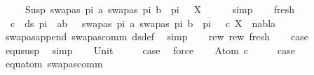\begin{isabellebody}
\ \ \ \ {\isacharequal}{\kern0pt}\ Susp\ {\isacharparenleft}{\kern0pt}{\isacharbrackleft}{\kern0pt}{\isacharparenleft}{\kern0pt}swapas\ pi\ a{\isacharcomma}{\kern0pt}\ swapas\ pi\ b{\isacharparenright}{\kern0pt}{\isacharbrackright}{\kern0pt}\ {\isacharat}{\kern0pt}\ pi\ {\isacharat}{\kern0pt}\ {\isasympi}{\isacharprime}{\kern0pt}{\isacharparenright}{\kern0pt}\ X{\isachardoublequoteclose}\isanewline
\ \ \ \ \isamarkupfalse%
\ simp\isanewline
\ \ \isamarkupfalse%
\ fresh{\isacharcolon}{\kern0pt}\isanewline
\ \ {\isachardoublequoteopen}{\isasymforall}c\ {\isasymin}\ ds\ {\isacharparenleft}{\kern0pt}pi\ {\isacharat}{\kern0pt}\ {\isacharbrackleft}{\kern0pt}{\isacharparenleft}{\kern0pt}a{\isacharcomma}{\kern0pt}b{\isacharparenright}{\kern0pt}{\isacharbrackright}{\kern0pt}\ {\isacharat}{\kern0pt}\ {\isasympi}{\isacharprime}{\kern0pt}{\isacharparenright}{\kern0pt}\ {\isacharparenleft}{\kern0pt}{\isacharbrackleft}{\kern0pt}{\isacharparenleft}{\kern0pt}swapas\ pi\ a{\isacharcomma}{\kern0pt}\ swapas\ pi\ b{\isacharparenright}{\kern0pt}{\isacharbrackright}{\kern0pt}\ {\isacharat}{\kern0pt}\ pi\ {\isacharat}{\kern0pt}\ {\isasympi}{\isacharprime}{\kern0pt}{\isacharparenright}{\kern0pt}{\isachardot}{\kern0pt}\ {\isacharparenleft}{\kern0pt}c{\isacharcomma}{\kern0pt}\ X{\isacharparenright}{\kern0pt}\ {\isasymin}\ nabla{\isachardoublequoteclose}\isanewline
\ \ \ \ \isamarkupfalse%
\ swapas{\isacharunderscore}{\kern0pt}append\ swapas{\isacharunderscore}{\kern0pt}comm\ ds{\isacharunderscore}{\kern0pt}def\ \isamarkupfalse%
\ simp\isanewline
\ \ \isamarkupfalse%
\ rew{}\ rew{}\ fresh\isanewline
\ \ \isamarkupfalse%
\ {\isacharquery}{\kern0pt}case\isanewline
\ \ \ \ \isamarkupfalse%
\ equ{\isacharunderscore}{\kern0pt}susp\ \isamarkupfalse%
\ simp\isanewline
{}\isamarkupfalse%
\isanewline
\ \ \isamarkupfalse%
\ Unit\isanewline
\ \ \isamarkupfalse%
\ \isamarkupfalse%
\ {\isacharquery}{\kern0pt}case\ \isamarkupfalse%
\ force\isanewline
{}\isamarkupfalse%
\isanewline
\ \ \isamarkupfalse%
\ {\isacharparenleft}{\kern0pt}Atom\ c{\isacharparenright}{\kern0pt}\isanewline
\ \ \isamarkupfalse%
\ \isamarkupfalse%
\ {\isacharquery}{\kern0pt}case\ \isanewline
\ \ \ \ \isamarkupfalse%
\ equ{\isacharunderscore}{\kern0pt}atom\ swapas{\isacharunderscore}{\kern0pt}comm\ \isamarkupfalse%

\end{isabellebody}
